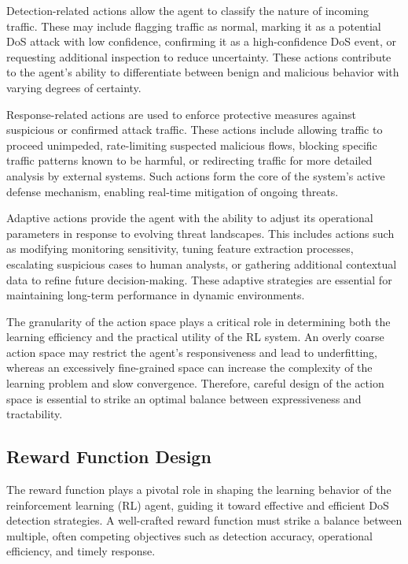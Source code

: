 \documentclass{report}
\begin{document}
Detection-related actions allow the agent to classify the nature of incoming traffic. These may include flagging traffic as normal, marking it as a potential DoS attack with low confidence, confirming it as a high-confidence DoS event, or requesting additional inspection to reduce uncertainty. These actions contribute to the agent’s ability to differentiate between benign and malicious behavior with varying degrees of certainty.

Response-related actions are used to enforce protective measures against suspicious or confirmed attack traffic. These actions include allowing traffic to proceed unimpeded, rate-limiting suspected malicious flows, blocking specific traffic patterns known to be harmful, or redirecting traffic for more detailed analysis by external systems. Such actions form the core of the system's active defense mechanism, enabling real-time mitigation of ongoing threats.

Adaptive actions provide the agent with the ability to adjust its operational parameters in response to evolving threat landscapes. This includes actions such as modifying monitoring sensitivity, tuning feature extraction processes, escalating suspicious cases to human analysts, or gathering additional contextual data to refine future decision-making. These adaptive strategies are essential for maintaining long-term performance in dynamic environments.

The granularity of the action space plays a critical role in determining both the learning efficiency and the practical utility of the RL system. An overly coarse action space may restrict the agent's responsiveness and lead to underfitting, whereas an excessively fine-grained space can increase the complexity of the learning problem and slow convergence. Therefore, careful design of the action space is essential to strike an optimal balance between expressiveness and tractability.


\subsection{Reward Function Design}

The reward function plays a pivotal role in shaping the learning behavior of the reinforcement learning (RL) agent, guiding it toward effective and efficient DoS detection strategies. A well-crafted reward function must strike a balance between multiple, often competing objectives such as detection accuracy, operational efficiency, and timely response.
\end{document}
